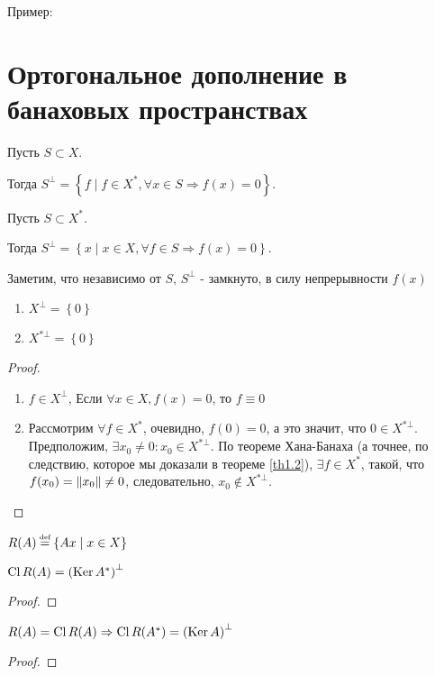Пример: \todo

\section{Ортогональное дополнение в банаховых пространствах}


\begin{definition}
	Пусть $S \subset X$.

	 Тогда $S^\bot = \left\{ f \mid f \in X^*, \forall x \in S \Rightarrow f(x) = 0 \right\}$.
\end{definition}

\begin{definition}
	Пусть $S \subset X^*$.

	 Тогда $S^\bot = \left\{ x \mid x \in X, \forall f \in S \Rightarrow f(x) = 0 \right\}$.
\end{definition}
Заметим, что независимо от $S$, $S^\bot$ - замкнуто, в силу непрерывности $f(x)$

\begin{statement}
	\begin{minipage}[t]{\linegoal}
	\begin{enumerate}[leftmargin=*]
		\item 	$X^\bot = \left\{ 0\right\}$
		\item   $X^{*\bot} = \left\{ 0\right\}$
	\end{enumerate}
	\end{minipage}
\end{statement}
\begin{proof}
	\begin{enumerate}[leftmargin=*]
		\item $f \in X^\bot$, Если $\forall x \in X, f(x) = 0 $, то $f \equiv 0$
		\item Рассмотрим $\forall f \in X^*$, очевидно, $f(0) = 0$, а это значит, что
		$0 \in X^{*\bot}$. Предположим, $\exists x_0 \neq 0 : x_0 \in X^{*\bot}$.
		По теореме Хана-Банаха (а точнее, по следствию, которое мы доказали в теореме \ref{th1.2}), 
		$\exists f \in X^*$, такой, что
		$f(x_0) = \left\|x_0\right\| \neq 0$, следовательно, $x_0 \not\in X^{*\bot}$.
	\end{enumerate}
\end{proof}

\begin{definition}
	$R(A) \defeq \left\{ Ax \mid x \in X\right\}$
\end{definition}

\begin{theorem}
	$\operatorname{Cl} R(A) = \left( \operatorname{Ker} A^*\right)^\bot$
\end{theorem}
\begin{proof}
	\todo
\end{proof}
\begin{theorem}
	$R(A) = \operatorname{Cl} R(A) \Rightarrow \operatorname{Cl} R(A^*) = \left( \operatorname{Ker} A\right)^\bot$
\end{theorem}
\begin{proof}
	\todo
\end{proof}
